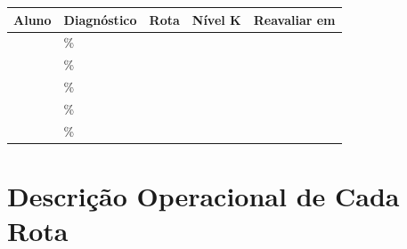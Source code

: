 \begin{center}
\begin{tabular}{|l|l|c|c|c|}
\hline
\textbf{Aluno} & \textbf{Diagnóstico} & \textbf{Rota} & \textbf{Nível K} & \textbf{Reavaliar em} \\
\hline
\underline{\hspace{3cm}} & \underline{\hspace{1cm}}\% & \underline{\hspace{1cm}} & \underline{\hspace{1cm}} & \underline{\hspace{1.5cm}} \\
\hline
\underline{\hspace{3cm}} & \underline{\hspace{1cm}}\% & \underline{\hspace{1cm}} & \underline{\hspace{1cm}} & \underline{\hspace{1.5cm}} \\
\hline
\underline{\hspace{3cm}} & \underline{\hspace{1cm}}\% & \underline{\hspace{1cm}} & \underline{\hspace{1cm}} & \underline{\hspace{1.5cm}} \\
\hline
\underline{\hspace{3cm}} & \underline{\hspace{1cm}}\% & \underline{\hspace{1cm}} & \underline{\hspace{1cm}} & \underline{\hspace{1.5cm}} \\
\hline
\underline{\hspace{3cm}} & \underline{\hspace{1cm}}\% & \underline{\hspace{1cm}} & \underline{\hspace{1cm}} & \underline{\hspace{1.5cm}} \\
\hline
\end{tabular}
\end{center}

\rotasindividualizadas

\section{Descrição Operacional de Cada Rota}


